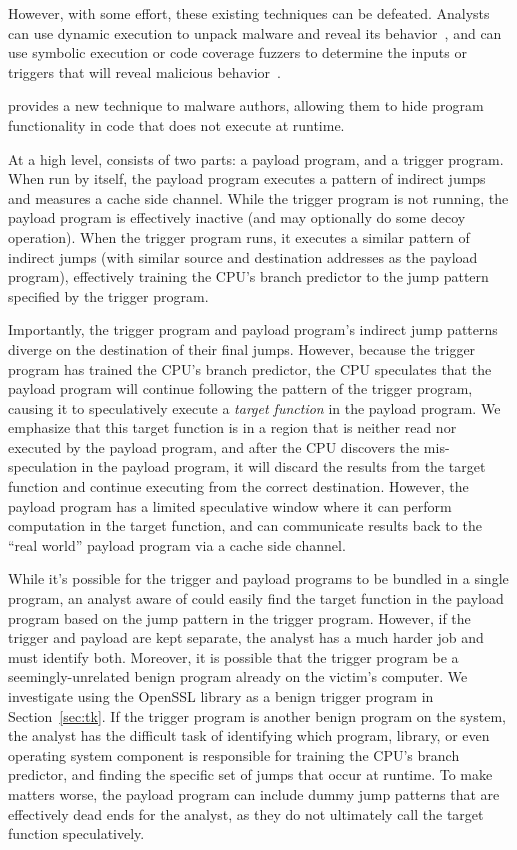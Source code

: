 However, with some effort, these existing techniques can be defeated. Analysts can use
dynamic execution to unpack malware and reveal its
behavior~\cite{balzarotti2010efficient}, and can use symbolic execution or code
coverage fuzzers to determine the inputs or triggers that will reveal malicious
behavior~\cite{moser2007exploring,schwartz2010all,wang2017angr,egele2012survey}.


\speculake provides a new technique to malware authors, allowing them to hide
program functionality in code that does not execute at runtime.


At a high level, \speculake consists of two parts: a payload program, and a
trigger program. When run by itself, the payload program executes a pattern of
indirect jumps and measures a cache side channel. While the trigger program is
not running, the payload program is effectively inactive (and may optionally do some
decoy operation). When the trigger program runs, it executes a similar pattern of
indirect jumps (with similar source and destination addresses as the payload
program), effectively training the CPU's branch predictor to the jump pattern
specified by the trigger program.

Importantly, the trigger program and payload
program's indirect jump patterns diverge on the destination of their final jumps.
However, because the trigger program has trained the CPU's branch predictor, the
CPU speculates that the payload program will continue following the pattern of
the trigger program, causing it to speculatively execute a
\emph{target function} in the payload program. We emphasize that this target
function is in a region that is neither read nor executed by the payload
program, and after the CPU discovers the mis-speculation in the payload program,
it will discard the results from the target function and continue executing from
the correct destination. However, the payload program has a limited speculative
window where it can perform computation in the target function, and can
communicate results back to the ``real world'' payload program via a cache side
channel.


While it's possible for the trigger and payload programs to be bundled in a
single program, an analyst aware of \speculake could easily find the target
function in the payload program based on the jump pattern in the trigger program.
However, if the trigger and payload are kept separate, the analyst has a much
harder job and must identify both.
Moreover, it is possible that the trigger program be a
seemingly-unrelated benign program already on the victim's computer. We
investigate using the OpenSSL library as a benign trigger
program in Section~\ref{sec:tk}. If the trigger program is another benign
program on the system, the analyst has the difficult task of identifying which
program, library, or even operating system component is responsible for training
the CPU's branch predictor, and finding the specific set of jumps that occur at
runtime. To make matters worse, the payload program can include dummy jump
patterns that are effectively dead ends for the analyst, as they do not
ultimately call the target function speculatively.


